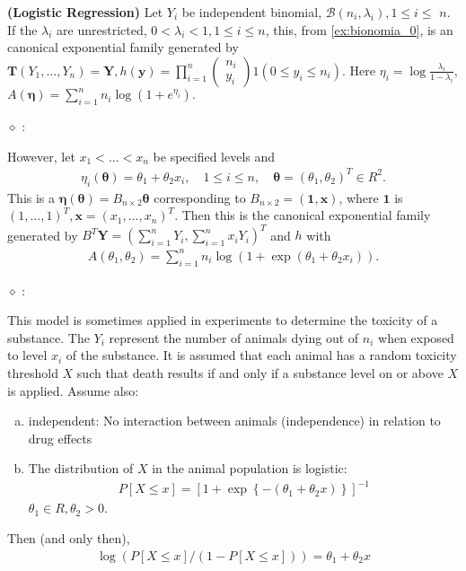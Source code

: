 \documentclass{article}
\newcommand{\bfs}[1]{\textbf{({#1}) }}
\begin{document}
\begin{exma}\bfs{Logistic Regression}\label{ex:log_reg}
 Let $Y_{i}$ be independent binomial, $\mathcal{B}\left(n_{i}, \lambda_{i}\right), 1 \leq i \leq$ $n$. If the $\lambda_{i}$ are unrestricted, $0<\lambda_{i}<1,1 \leq i \leq n$, this, from \cref{ex:bionomia_0}, is an  canonical exponential family generated by $\mathbf{T}\left(Y_{1}, \ldots, Y_{n}\right)=\mathbf{Y}, h(\mathbf{y})=\prod_{i=1}^{n}\left(\begin{array}{c}n_{i} \\ y_{i}\end{array}\right) 1\left(0 \leq y_{i} \leq n_{i}\right) .$ Here $\eta_{i}=\log \frac{\lambda_{i}}{1-\lambda_{i}}$, $A(\boldsymbol{\eta})=\sum_{i=1}^{n} n_{i} \log \left(1+e^{\eta_{i}}\right) .$ 
 
 $\diamond$ :
 
 However, let $x_{1}<\ldots<x_{n}$ be specified levels and
\begin{align*}
\eta_{i}(\boldsymbol{\theta})=\theta_{1}+\theta_{2} x_{i}, \quad 1 \leq i \leq n, \quad \boldsymbol{\theta}=\left(\theta_{1}, \theta_{2}\right)^{T} \in R^{2} .
\end{align*}
This is a  $\boldsymbol{\eta}(\boldsymbol{\theta})=B_{n \times 2} \boldsymbol{\theta}$ corresponding to $B_{n \times 2}=(\mathbf{1}, \mathbf{x})$, where $\mathbf{1}$ is $(1, \ldots, 1)^{T}, \mathbf{x}=\left(x_{1}, \ldots, x_{n}\right)^{T} .$ Then this is the  canonical exponential family generated by $B^T\mathbf{Y}=\left(\sum_{i=1}^{n} Y_{i}, \sum_{i=1}^{n} x_{i} Y_{i}\right)^{T}$ and $h$ with
\begin{align*}
A\left(\theta_{1}, \theta_{2}\right)=\sum_{i=1}^{n} n_{i} \log \left(1+\exp \left(\theta_{1}+\theta_{2} x_{i}\right)\right) .
\end{align*}

 $\diamond$ :
 
This model is sometimes applied in experiments to determine the toxicity of a substance. The $Y_{i}$ represent the number of animals dying out of $n_{i}$ when exposed to level $x_{i}$ of the substance. It is assumed that each animal has a random toxicity threshold $X$ such that death results if and only if a substance level on or above $X$ is applied. Assume also:
\begin{enumerate}[(a).]
    \item independent: No interaction between animals (independence) in relation to drug effects
    \item The distribution of $X$ in the animal population is logistic:
    \begin{align*}
P[X \leq x]=\left[1+\exp \left\{-\left(\theta_{1}+\theta_{2} x\right)\right\}\right]^{-1}
\end{align*}
$\theta_{1} \in R, \theta_{2}>0$.
\end{enumerate}
Then (and only then),
\begin{align*}
\log (P[X \leq x] /(1-P[X \leq x]))=\theta_{1}+\theta_{2} x
\end{align*}
\end{exma}
\end{document}

